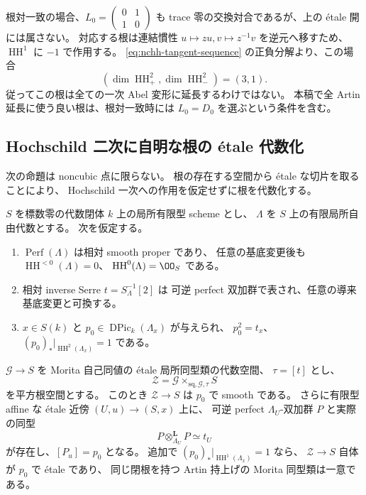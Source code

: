 \begin{remark}
\label{rem:noncubic-offdiagonal-root}
根対一致の場合、$L_0=\left(\begin{smallmatrix}0&1\\1&0\end{smallmatrix}\right)$
も trace 零の交換対合であるが、上の \texorpdfstring{\'etale}{etale} 開には属さない。
対応する根は連結慣性
$u\mapsto zu,v\mapsto z^{-1}v$ を逆元へ移すため、
$\operatorname{HH}^1$ に $-1$ で作用する。
\eqref{eq:nchh-tangent-sequence} の正負分解より、この場合
\[
 (\dim\operatorname{HH}^2_+,\dim\operatorname{HH}^2_-)=(3,1).
\]
従ってこの根は全ての一次 Abel 変形に延長するわけではない。
本稿で全 Artin 延長に使う良い根は、根対一致時には
$L_0=D_0$ を選ぶという条件を含む。
\end{remark}

\subsection{Hochschild 二次に自明な根の étale 代数化}
\label{subsec:hh2-etale-morita-root}

次の命題は noncubic 点に限らない。
根の存在する空間から étale な切片を取ることにより、
Hochschild 一次への作用を仮定せずに根を代数化する。

\begin{proposition}
\label{prop:hh2-etale-morita-root}
$S$ を標数零の代数閉体 $k$ 上の局所有限型 scheme とし、
$\Lambda$ を $S$ 上の有限局所自由代数とする。
次を仮定する。
\begin{enumerate}
\item $\operatorname{Perf}(\Lambda)$ は相対 smooth proper であり、
任意の基底変更後も
$\operatorname{HH}^{<0}(\Lambda)=0$、
$\operatorname{HH}^0(\Lambda)=\OO_S$ である。
\item 相対 inverse Serre $t=S_\Lambda^{-1}[2]$ は
可逆 perfect 双加群で表され、任意の導来基底変更と可換する。
\item $x\in S(k)$ と
$p_0\in\operatorname{DPic}_k(\Lambda_x)$ が与えられ、
$p_0^2=t_x$、
$(p_0)_*|_{\operatorname{HH}^2(\Lambda_x)}=1$ である。
\end{enumerate}
$\mathcal G\to S$ を Morita 自己同値の étale 局所同型類の代数空間、
$\tau=[t]$ とし、
\[
 \mathcal Z=
 \mathcal G\times_{\mathrm{sq},\mathcal G,\tau}S
\]
を平方根空間とする。
このとき $\mathcal Z\to S$ は $p_0$ で smooth である。
さらに有限型 affine な étale 近傍 $(U,u)\to(S,x)$ 上に、
可逆 perfect $\Lambda_U$-双加群 $P$ と実際の同型
\[
 P\otimes_{\Lambda_U}^{\mathbf L}P\simeq t_U
 \tag{N-root}\label{eq:hh2-etale-actual-root}
\]
が存在し、$[P_u]=p_0$ となる。
追加で $(p_0)_*|_{\operatorname{HH}^1(\Lambda_x)}=1$ なら、
$\mathcal Z\to S$ 自体が $p_0$ で étale であり、
同じ閉根を持つ Artin 持上げの Morita 同型類は一意である。
\end{proposition}

